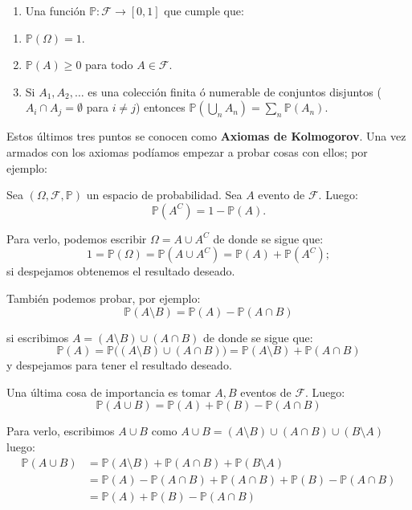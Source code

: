 \documentclass[
]{book}
\providecommand{\tightlist}{%
  \setlength{\itemsep}{0pt}\setlength{\parskip}{0pt}}
\begin{document}
\begin{enumerate}
\def\labelenumi{\arabic{enumi}.}
\setcounter{enumi}{2}
\tightlist
\item
  Una función \(\mathbb{P}:\mathcal{F} \to [0,1]\) que cumple que:
\end{enumerate}

\begin{enumerate}
\def\labelenumi{\alph{enumi}.}
\tightlist
\item
  \(\mathbb{P}(\Omega) = 1\).
\item
  \(\mathbb{P}(A) \geq 0\) para todo \(A \in \mathcal{F}\).
\item
  Si \(A_1, A_2, \dots\) es una colección finita ó numerable de conjuntos disjuntos (\(A_i\cap A_j = \emptyset\) para \(i \neq j\)) entonces \(\mathbb{P}(\bigcup_{n} A_n) = \sum\limits_{n}\mathbb{P}(A_n)\).
\end{enumerate}

Estos últimos tres puntos se conocen como \textbf{Axiomas de Kolmogorov}. Una vez armados con los axiomas podíamos empezar a probar cosas con ellos; por ejemplo:

Sea \((\Omega,\mathcal{F},\mathbb{P})\) un espacio de probabilidad. Sea \(A\) evento de \(\mathcal{F}\). Luego:
\[
\mathbb{P}(A^C) = 1 - \mathbb{P}(A).
\]

Para verlo, podemos escribir \(\Omega = A\cup A^C\) de donde se sigue que:
\[
1 = \mathbb{P}(\Omega) = \mathbb{P}(A \cup A^C) = \mathbb{P}(A) + \mathbb{P}(A^C);
\]
si despejamos obtenemos el resultado deseado.

También podemos probar, por ejemplo:
\[
\mathbb{P}(A\setminus B) = \mathbb{P}(A) - \mathbb{P}(A \cap B)
\]

si escribimos \(A = (A\setminus B) \cup (A \cap B)\) de donde se sigue que:
\[
\mathbb{P}(A) = \mathbb{P}\big((A\setminus B) \cup (A \cap B) \big) =  \mathbb{P}(A\setminus B) + \mathbb{P} (A \cap B)
\]
y despejamos para tener el resultado deseado.

Una última cosa de importancia es tomar \(A,B\) eventos de \(\mathcal{F}\). Luego:
\[
\mathbb{P}(A \cup B) = \mathbb{P}(A) + \mathbb{P}(B) - \mathbb{P}(A \cap B)
\]

Para verlo, escribimos \(A\cup B\) como \(A\cup B = (A\setminus B)\cup (A \cap B)\cup (B\setminus A)\) luego:
\begin{equation}\nonumber
\begin{aligned}
\mathbb{P}(A\cup B) & = \mathbb{P}(A\setminus B) + \mathbb{P} (A \cap B) + \mathbb{P}(B\setminus A) \\
& = \mathbb{P}(A) - \mathbb{P}(A \cap B) + \mathbb{P} (A \cap B) + \mathbb{P}(B) - \mathbb{P}(A \cap B)
\\ & = \mathbb{P}(A) + \mathbb{P}(B) - \mathbb{P}(A \cap B)
\end{aligned}
\end{equation}
\end{document}
